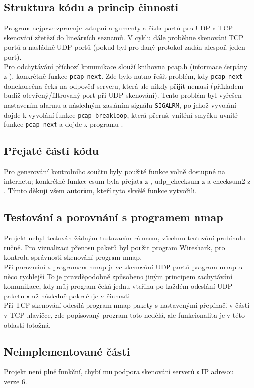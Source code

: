 \documentclass[a4paper, 11pt]{article}
\begin{document}
\subsection{Struktura kódu a princip činnosti}
Program nejprve zpracuje vstupní argumenty a čísla portů pro UDP a TCP skenování zřetězí do lineárních seznamů. V cyklu dále proběhne skenování TCP portů a nasládně UDP portů (pokud byl pro daný protokol zadán alespoň jeden port).\\
Pro odchytávání příchozí komunikace slouží knihovna pcap.h (informace čerpány z \cite{pcap}), konkrétně funkce \texttt{pcap\_next}. Zde bylo nutno řešit problém, kdy \texttt{pcap\_next} donekonečna čeká na odpověď serveru, která ale nikdy přijít nemusí (příkladem budiž otevřený/filtrovaný port při UDP skenování). Tento problém byl vyřešen nastavením alarmu a následným zasláním signálu \texttt{SIGALRM}, po jehož vyvolání dojde k vyvolání funkce \texttt{pcap\_breakloop}, která přeruší vnitřní smyčku uvnitř funkce \texttt{pcap\_next} a dojde k  programu \cite{breakloop}.  
\subsection{Přejaté části kódu}
Pro generování kontrolního součtu byly použité funkce volně dostupné na internetu; konkrétně funkce csum byla přejata z \cite{RawSocket}, udp\_checksum z \cite{Checksum} a checksum2 z \cite{checksum2}. Tímto děkuji všem autorům, kteří tyto skvělé funkce vytvořili.\\
\subsection{Testování a porovnání s programem nmap}
Projekt nebyl testován žádným testovacím rámcem, všechno testování probíhalo ručně. Pro vizualizaci přenosu paketů byl použit program Wireshark, pro kontrolu správnosti skenování program nmap.\\
Při porovnání s programem nmap je ve skenování UDP portů program nmap o něco rychlejší To je pravděpodobně způsobeno jiným principem zachytávání komunikace, kdy můj program čeká jednu vteřinu po každém odeslání UDP paketu a až následně pokračuje v činnosti.\\
Při TCP skenování odesílá program nmap pakety s nastavenými přepínači v části v TCP hlavičce, zde popisovaný program toto nedělá, ale funkcionalita je v této oblasti totožná.
\subsection{Neimplementované části}
Projekt není plně funkční, chybí mu podpora skenování serverů s IP adresou verze 6.
\end{document}
